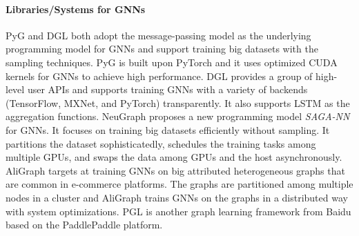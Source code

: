\paragraph{Libraries/Systems for GNNs}

PyG \cite{PyG} and DGL \cite{DGL} both adopt the message-passing model as the underlying programming model for GNNs and support training big datasets with the sampling techniques.
PyG \cite{PyG} is built upon PyTorch and it uses optimized CUDA kernels for GNNs to achieve high performance.
DGL \cite{DGL} provides a group of high-level user APIs and supports training GNNs with a variety of backends (TensorFlow, MXNet, and PyTorch) transparently.
It also supports LSTM as the aggregation functions.
NeuGraph \cite{ma2019_neugraph} proposes a new programming model \emph{SAGA-NN} for GNNs.
It focuses on training big datasets efficiently without sampling.
It partitions the dataset sophisticatedly, schedules the training tasks among multiple GPUs, and swaps the data among GPUs and the host asynchronously.
AliGraph \cite{zhu2019_aligraph} targets at training GNNs on big attributed heterogeneous graphs that are common in e-commerce platforms.
The graphs are partitioned among multiple nodes in a cluster and AliGraph trains GNNs on the graphs in a distributed way with system optimizations.
PGL \cite{PGL} is another graph learning framework from Baidu based on the PaddlePaddle platform.
